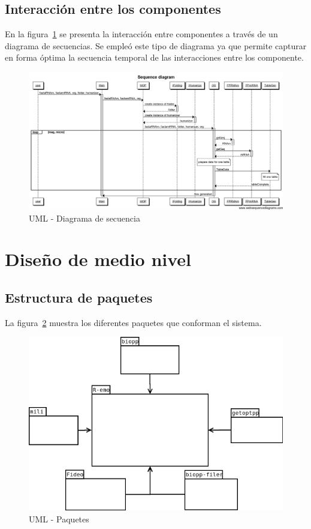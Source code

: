 \documentclass[12pt,a4paper,spanish]{article}
\begin{document}
\subsection{Interacción entre los componentes}
En la figura~\ref{mensajes} se presenta la interacción entre componentes a través de un diagrama de secuencias. Se empleó este tipo de diagrama ya que permite capturar en forma óptima la secuencia temporal de las interacciones entre los componente.

\begin{figure}
  \centering
  \includegraphics[scale=0.45, angle=90]{image/sequenceDiagrams.png}  
  \caption{UML - Diagrama de secuencia}
  \label{mensajes}
\end{figure}

\section{Diseño de medio nivel}
\subsection{Estructura de paquetes}
La figura~\ref{package} muestra los diferentes paquetes que conforman el sistema.
\begin{figure}
  \centering
  \includegraphics[scale=0.65]{image/packageDiagramHighGranularity.png}  
  \caption{UML - Paquetes}
  \label{package}
\end{figure}
\end{document}
